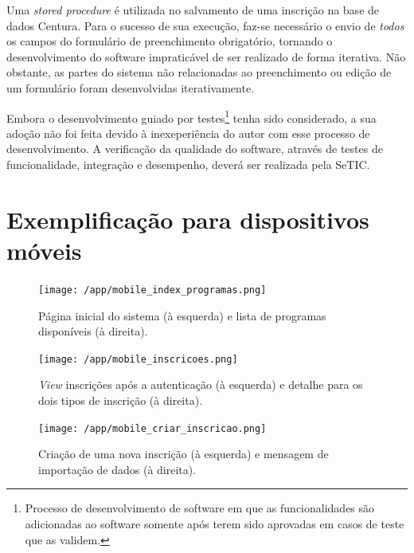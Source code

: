 \documentclass[
  10.5pt,				  %
	openright,			%
	twoside,			  %
  a5paper,
  chapter=TITLE,	%
	section=TITLE,	%
  hyphens,        %
	english,        %
	brazil          %
]{abntex2}
\begin{document}
Uma \emph{stored procedure} é utilizada no salvamento de uma inscrição na base de dados Centura. Para o sucesso de sua execução, faz-se necessário o envio de \emph{todos} os campos do formulário de preenchimento obrigatório, tornando o desenvolvimento do software impraticável de ser realizado de forma iterativa. Não obstante, as partes do sistema não relacionadas ao preenchimento ou edição de um formulário foram desenvolvidas iterativamente.

Embora o desenvolvimento guiado por testes\footnote{Processo de desenvolvimento de software em que as funcionalidades são adicionadas ao software somente após terem sido aprovadas em casos de teste que as validem.} tenha sido considerado, a sua adoção não foi feita devido à inexeperiência do autor com esse processo de desenvolvimento. A verificação da qualidade do software, através de testes de funcionalidade, integração e desempenho, deverá ser realizada pela SeTIC.


\chapter{Exemplificação para dispositivos móveis}\label{anexo:mobile}

\begin{figure}[!ht]
  \caption{\label{fig:mobile_index_programas} Página inicial do sistema (à esquerda) e lista de programas disponíveis (à direita).}
  \begin{center}
    \texttt{[image: /app/mobile\_index\_programas.png]}
  \end{center}
\end{figure}


\begin{figure}[!ht]
  \caption{\label{fig:mobile_inscricoes} \emph{View} inscrições após a autenticação (à esquerda) e detalhe para os dois tipos de inscrição (à direita).}
  \begin{center}
    \texttt{[image: /app/mobile\_inscricoes.png]}
  \end{center}
\end{figure}

\begin{figure}[!ht]
  \caption{\label{fig:mobile_criar_inscricao} Criação de uma nova inscrição (à esquerda) e mensagem de importação de dados (à direita).}
  \begin{center}
    \texttt{[image: /app/mobile\_criar\_inscricao.png]}
  \end{center}
\end{figure}
\end{document}
